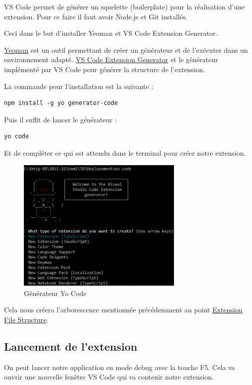 \documentclass[
    iict, %
    il, %
]{heig-tb}
\begin{document}
VS Code permet de générer un squelette (boilerplate) pour la réalisation d'une extension.
Pour ce faire il faut avoir Node.js et Git installés.

Ceci dans le but d'installer Yeoman et VS Code Extension Generator.

\href{https://yeoman.io/}{Yeoman} est un outil permettant de créer un générateur et de l'exécuter dans un environnement adapté.
\href{https://www.npmjs.com/package/generator-code}{VS Code Extension Generator} et le générateur implémenté par VS Code pour générer la structure de l'extension.

La commande pour l'installation est la suivante :

\begin{lstlisting}[frame=single]
npm install -g yo generator-code
\end{lstlisting}

Puis il suffit de lancer le générateur :

\begin{lstlisting}[frame=single]
yo code
\end{lstlisting}

Et de compléter ce qui est attendu dans le terminal pour créer notre extension.

\begin{figure}[!h]
    \begin{center}
        \includegraphics[width=8cm]{assets/figures/yo-code.png}
    \end{center}
    \caption[Générateur Yo Code]{\label{yo-code}Générateur Yo Code}
\end{figure}

Cela nous créera l'arborescence mentionnée précédemment au point \hyperref[Extension File Structure]{Extension File Structure}.

\subsection{Lancement de l'extension}
On peut lancer notre application en mode debug avec la touche F5. Cela va ouvrir une nouvelle fenêtre VS Code qui va contenir notre extension.
\end{document}
